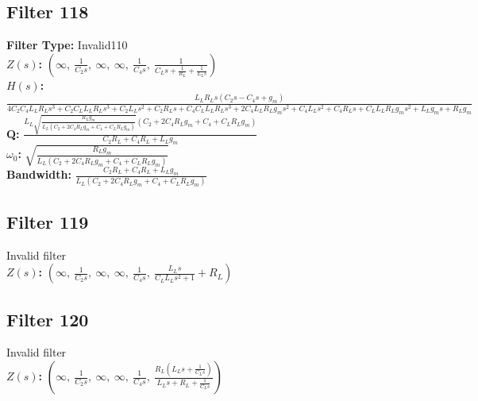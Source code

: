 \documentclass{article}
\begin{document}
\subsection*{Filter 118}
\textbf{Filter Type:} Invalid110 \\ 
\textbf{$Z(s)$:} $\left( \infty, \  \frac{1}{C_{2} s}, \  \infty, \  \infty, \  \frac{1}{C_{4} s}, \  \frac{1}{C_{L} s + \frac{1}{R_{L}} + \frac{1}{L_{L} s}}\right)$ \\ 
\textbf{$H(s)$:} $\frac{L_{L} R_{L} s \left(C_{2} s - C_{4} s + g_{m}\right)}{4 C_{2} C_{4} L_{L} R_{L} s^{3} + C_{2} C_{L} L_{L} R_{L} s^{3} + C_{2} L_{L} s^{2} + C_{2} R_{L} s + C_{4} C_{L} L_{L} R_{L} s^{3} + 2 C_{4} L_{L} R_{L} g_{m} s^{2} + C_{4} L_{L} s^{2} + C_{4} R_{L} s + C_{L} L_{L} R_{L} g_{m} s^{2} + L_{L} g_{m} s + R_{L} g_{m}}$ \\ 
\textbf{Q:} $\frac{L_{L} \sqrt{\frac{R_{L} g_{m}}{L_{L} \left(C_{2} + 2 C_{4} R_{L} g_{m} + C_{4} + C_{L} R_{L} g_{m}\right)}} \left(C_{2} + 2 C_{4} R_{L} g_{m} + C_{4} + C_{L} R_{L} g_{m}\right)}{C_{2} R_{L} + C_{4} R_{L} + L_{L} g_{m}}$ \\ 
\textbf{$\omega_0$:} $\sqrt{\frac{R_{L} g_{m}}{L_{L} \left(C_{2} + 2 C_{4} R_{L} g_{m} + C_{4} + C_{L} R_{L} g_{m}\right)}}$ \\ 
\textbf{Bandwidth:} $\frac{C_{2} R_{L} + C_{4} R_{L} + L_{L} g_{m}}{L_{L} \left(C_{2} + 2 C_{4} R_{L} g_{m} + C_{4} + C_{L} R_{L} g_{m}\right)}$ \\ 
\subsection*{Filter 119}
Invalid filter \\ 
\textbf{$Z(s)$:} $\left( \infty, \  \frac{1}{C_{2} s}, \  \infty, \  \infty, \  \frac{1}{C_{4} s}, \  \frac{L_{L} s}{C_{L} L_{L} s^{2} + 1} + R_{L}\right)$ \\ 
\subsection*{Filter 120}
Invalid filter \\ 
\textbf{$Z(s)$:} $\left( \infty, \  \frac{1}{C_{2} s}, \  \infty, \  \infty, \  \frac{1}{C_{4} s}, \  \frac{R_{L} \left(L_{L} s + \frac{1}{C_{L} s}\right)}{L_{L} s + R_{L} + \frac{1}{C_{L} s}}\right)$ \\ 
\end{document}
